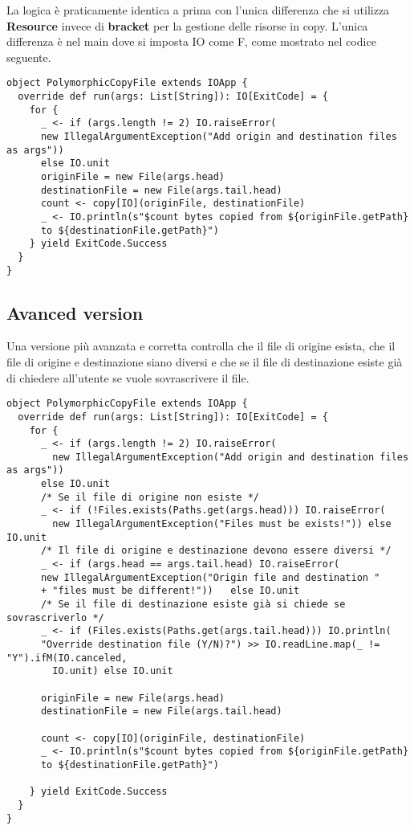 \noindent La logica è praticamente identica a prima con l’unica differenza che si utilizza \textbf{Resource} invece di \textbf{bracket} per la gestione delle risorse in copy. L'unica differenza è nel main dove si imposta IO come F, come mostrato nel codice seguente.

\begin{verbatim}
object PolymorphicCopyFile extends IOApp {
  override def run(args: List[String]): IO[ExitCode] = {
    for {
      _ <- if (args.length != 2) IO.raiseError(
      new IllegalArgumentException("Add origin and destination files as args"))
      else IO.unit
      originFile = new File(args.head)
      destinationFile = new File(args.tail.head)
      count <- copy[IO](originFile, destinationFile)
      _ <- IO.println(s"$count bytes copied from ${originFile.getPath} 
      to ${destinationFile.getPath}")
    } yield ExitCode.Success
  }
}    
\end{verbatim}

\subsection{Avanced version}
Una versione più avanzata e corretta controlla che il file di origine esista, che il file di
origine e destinazione siano diversi e che se il file di destinazione esiste già di chiedere
all’utente se vuole sovrascrivere il file.

\begin{verbatim}
object PolymorphicCopyFile extends IOApp {
  override def run(args: List[String]): IO[ExitCode] = {
    for {
      _ <- if (args.length != 2) IO.raiseError(
        new IllegalArgumentException("Add origin and destination files as args"))
      else IO.unit
      /* Se il file di origine non esiste */
      _ <- if (!Files.exists(Paths.get(args.head))) IO.raiseError(
        new IllegalArgumentException("Files must be exists!")) else IO.unit
      /* Il file di origine e destinazione devono essere diversi */
      _ <- if (args.head == args.tail.head) IO.raiseError(
      new IllegalArgumentException("Origin file and destination "
      + "files must be different!"))   else IO.unit
      /* Se il file di destinazione esiste già si chiede se sovrascriverlo */
      _ <- if (Files.exists(Paths.get(args.tail.head))) IO.println(
      "Override destination file (Y/N)?") >> IO.readLine.map(_ != "Y").ifM(IO.canceled, 
        IO.unit) else IO.unit

      originFile = new File(args.head)
      destinationFile = new File(args.tail.head)

      count <- copy[IO](originFile, destinationFile)
      _ <- IO.println(s"$count bytes copied from ${originFile.getPath} 
      to ${destinationFile.getPath}")

    } yield ExitCode.Success
  }
}
    
\end{verbatim}

